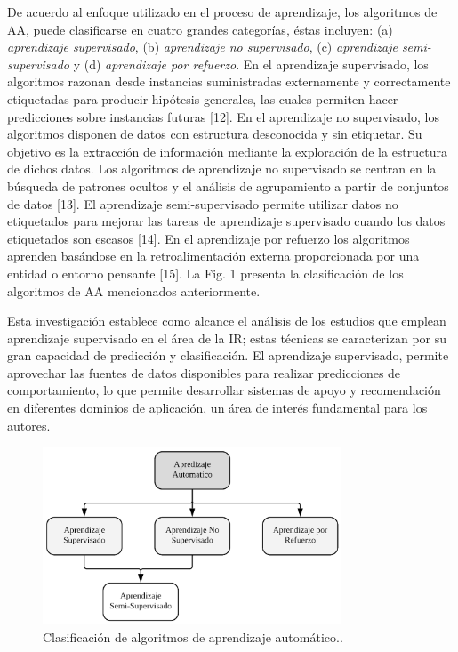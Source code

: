 \documentclass[journal]{IEEEtran}
\begin{document}
De acuerdo al enfoque utilizado en el proceso de aprendizaje, los algoritmos de AA, puede clasificarse en cuatro grandes categorías, éstas incluyen: (a) \textit{aprendizaje supervisado}, (b) \textit{aprendizaje no supervisado}, (c) \textit{aprendizaje semi-supervisado} y (d) \textit{aprendizaje por refuerzo}. 
En el aprendizaje supervisado, los algoritmos razonan desde instancias suministradas externamente y correctamente etiquetadas para producir hipótesis generales, las cuales permiten hacer predicciones sobre instancias futuras \cite{kotsiantis2007supervised}[12]. En el aprendizaje no supervisado, los algoritmos disponen de datos con estructura desconocida y sin etiquetar. Su objetivo es la extracción de información mediante la exploración de la estructura de dichos datos. Los algoritmos de aprendizaje no supervisado se centran en la búsqueda de patrones ocultos y el análisis de agrupamiento a partir de conjuntos de datos \cite{celebi2016unsupervised}[13]. El aprendizaje semi-supervisado permite utilizar datos no etiquetados para mejorar las tareas de aprendizaje supervisado cuando los datos etiquetados son escasos \cite{Knox2018}[14]. En el aprendizaje por refuerzo los algoritmos aprenden basándose en la retroalimentación externa proporcionada por una entidad o entorno pensante \cite{sutton1998reinforcement}[15]. La Fig. 1 presenta la clasificación de los algoritmos de AA mencionados anteriormente.

Esta investigación establece como alcance el análisis de los estudios que emplean aprendizaje supervisado en el área de la IR; estas técnicas se caracterizan por su gran capacidad de predicción y clasificación. El aprendizaje supervisado, permite aprovechar las fuentes de datos disponibles para realizar predicciones de comportamiento, lo que permite desarrollar sistemas de apoyo y recomendación en diferentes dominios de aplicación, un área de interés fundamental para los autores.

\begin{figure}[!t]
\centering
\includegraphics[width=3.5in]{figures/figure1_Guada.png}
\caption{Clasificación de algoritmos de aprendizaje automático..}
\label{fig1}
\end{figure}
\end{document}
